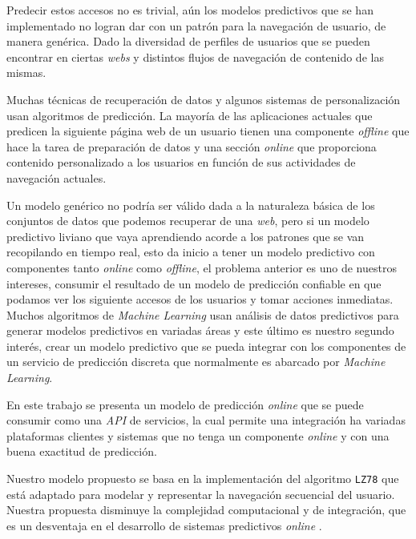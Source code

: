 {Predecir estos  accesos no es trivial, aún los modelos predictivos que se han implementado no logran dar con un patrón para la navegación de usuario, de manera genérica. Dado la diversidad de perfiles de usuarios que se pueden encontrar en ciertas \emph{webs}  y distintos flujos de navegación de contenido de las mismas.  

Muchas técnicas de recuperación de datos y algunos sistemas de personalización usan algoritmos de predicción. La mayoría de las aplicaciones actuales que predicen la siguiente página web de un usuario tienen una componente  \emph{offline} que hace la tarea de preparación de datos y una sección \emph{online} que proporciona contenido personalizado a los usuarios en función de sus actividades de navegación actuales.

Un modelo genérico no podría ser válido dada a la naturaleza básica de los conjuntos de datos que podemos recuperar de una \emph{web}, pero si un modelo predictivo liviano que vaya aprendiendo acorde a los patrones que se van recopilando en tiempo real, esto da inicio a tener un modelo predictivo con componentes tanto \emph{online} como \emph{offline}, el problema anterior es uno de nuestros intereses, consumir el resultado de un modelo de predicción confiable en que podamos ver los siguiente accesos de los usuarios y tomar acciones inmediatas. Muchos algoritmos de \emph{Machine Learning} usan análisis de datos predictivos para generar modelos predictivos en variadas áreas y este último es nuestro segundo interés, crear un modelo predictivo que se pueda integrar con los componentes de un servicio de predicción discreta que normalmente es abarcado por \emph{Machine Learning}.  

En este trabajo se presenta un modelo de predicción \emph{online} que se puede consumir como una \emph{API} de servicios, la cual permite una integración ha variadas plataformas clientes y sistemas que no tenga un componente \emph{online} y con una buena exactitud de predicción. 

Nuestro modelo propuesto se basa en la implementación del algoritmo \texttt{LZ78} que está adaptado para modelar y representar la navegación secuencial del usuario. Nuestra propuesta disminuye la complejidad computacional  y de integración, que es un desventaja en el desarrollo de sistemas predictivos \emph{online} .
}

